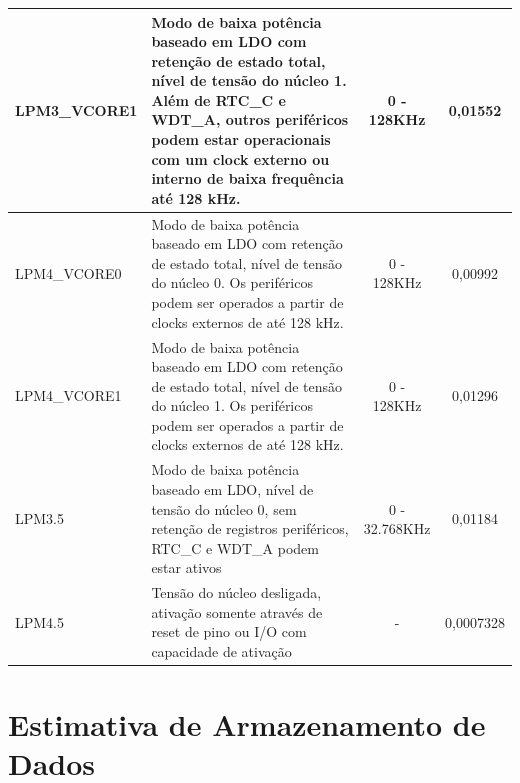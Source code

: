 \begin{apendicesenv}
\begin{table}[h]
{\begin{tabular}{@{}llcc@{}}
LPM3\_VCORE1                          & \multicolumn{1}{p{10.5cm}}{\raggedright Modo de baixa potência baseado em LDO com retenção de estado total, nível de tensão do núcleo 1. Além de RTC\_C e WDT\_A, outros periféricos podem estar operacionais com um clock externo ou interno de baixa frequência até 128 kHz. }& 0 - 128KHz    & 0,01552          \\ \hline
LPM4\_VCORE0                          & \multicolumn{1}{p{10.5cm}}{\raggedright Modo de baixa potência baseado em LDO com retenção de estado total, nível de tensão do núcleo 0. Os periféricos podem ser operados a partir de clocks externos de até 128 kHz.                                                         }& 0 - 128KHz    & 0,00992          \\ \hline
LPM4\_VCORE1                          & \multicolumn{1}{p{10.5cm}}{\raggedright Modo de baixa potência baseado em LDO com retenção de estado total, nível de tensão do núcleo 1. Os periféricos podem ser operados a partir de clocks externos de até 128 kHz.                                                         }& 0 - 128KHz    & 0,01296          \\ \hline
LPM3.5                                & \multicolumn{1}{p{10.5cm}}{\raggedright Modo de baixa potência baseado em LDO, nível de tensão do núcleo 0, sem retenção de registros periféricos, RTC\_C e WDT\_A podem estar ativos                                                                                          }& 0 - 32.768KHz & 0,01184          \\ \hline
LPM4.5                                & \multicolumn{1}{p{10.5cm}}{\raggedright Tensão do núcleo desligada, ativação somente através de reset de pino ou I/O com capacidade de ativação                                                                                                                                }& -             & 0,0007328        \\ \bottomrule
\end{tabular}}
\end{table}


\chapter{Estimativa de Armazenamento de Dados}
\label{apendiced}


\end{apendicesenv}
